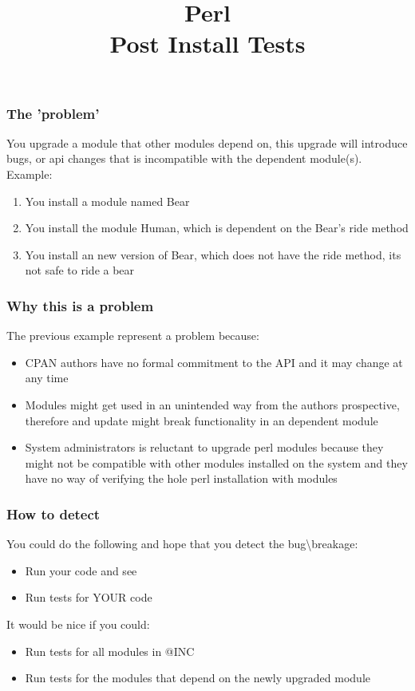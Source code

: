 \documentclass[10pt]{beamer}
\title{Perl \\ Post Install Tests}
\begin{document}
\begin{frame}
\titlepage
\end{frame}


\begin{frame}
\frametitle{The 'problem'}
You upgrade a module that other modules depend on, this upgrade will introduce bugs, or api changes that is incompatible with the dependent module(s).
Example:
\begin{enumerate}
  \item You install a module named Bear
  \item You install the module Human, which is dependent on the Bear's ride method
  \item You install an new version of Bear, which does not have the ride method, its not safe to ride a bear
\end{enumerate}
\end{frame}

\begin{frame}
\frametitle{Why this is a problem}
The previous example represent a problem because:
\begin{itemize}
\item CPAN authors have no formal commitment to the API and it may change at any time
\item Modules might get used in an unintended way from the authors prospective, therefore and update might break functionality in an dependent module
\item System administrators is reluctant to upgrade perl modules because they might not be compatible with other modules installed on the system and they have no way of verifying the hole perl installation with modules
\end{itemize}
\end{frame}

\begin{frame}
\frametitle{How to detect}
You could do the following and hope that you detect the bug\textbackslash breakage:
\begin{itemize}
\item Run your code and see
\item Run tests for YOUR code
\end{itemize}
\vspace{5 mm}
It would be nice if you could:
\begin{itemize}
\item Run tests for all modules in @INC 
\item Run tests for the modules that depend on the newly upgraded module
\end{itemize}
\end{frame}
\end{document}
